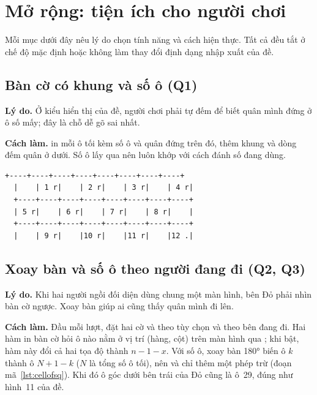 \chapter{Mở rộng: tiện ích cho người chơi}

Mỗi mục dưới đây nêu lý do chọn tính năng và cách hiện thực. Tất cả đều tắt ở chế độ mặc định hoặc không làm thay đổi định dạng nhập xuất của đề.

\section{Bàn cờ có khung và số ô (Q1)}

\textbf{Lý do.} Ở kiểu hiển thị của đề, người chơi phải tự đếm để biết quân mình đứng ở ô số mấy; đây là chỗ dễ gõ sai nhất.

\textbf{Cách làm.}  in mỗi ô tối kèm số ô và quân đứng trên đó, thêm khung và dòng đếm quân ở dưới. Số ô lấy qua  nên luôn khớp với cách đánh số đang dùng.

\begin{lstlisting}[style=screen,caption={Ba hàng đầu của bàn cờ có khung}]
  +----+----+----+----+----+----+----+----+
  |    | 1 r|    | 2 r|    | 3 r|    | 4 r|
  +----+----+----+----+----+----+----+----+
  | 5 r|    | 6 r|    | 7 r|    | 8 r|    |
  +----+----+----+----+----+----+----+----+
  |    | 9 r|    |10 r|    |11 r|    |12 .|
\end{lstlisting}

\section{Xoay bàn và số ô theo người đang đi (Q2, Q3)}\label{sec:xoay}

\textbf{Lý do.} Khi hai người ngồi đối diện dùng chung một màn hình, bên Đỏ phải nhìn bàn cờ ngược. Xoay bàn giúp ai cũng thấy quân mình đi lên.

\textbf{Cách làm.} Đầu mỗi lượt,  đặt hai cờ  và  theo tùy chọn và theo bên đang đi. Hai hàm in bàn cờ hỏi ô nào nằm ở vị trí (hàng, cột) trên màn hình qua ; khi  bật, hàm này đổi cả hai tọa độ thành $n-1-x$. Với số ô, xoay bàn 180° biến ô $k$ thành ô $N+1-k$ ($N$ là tổng số ô tối), nên  và  chỉ thêm một phép trừ (đoạn mã~\ref{lst:cellofsq}). Khi đó ô góc dưới bên trái của Đỏ cũng là ô~29, đúng như hình~11 của đề.


